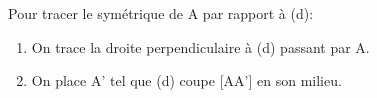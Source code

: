 Pour tracer le symétrique de \textsf{A} par rapport à \textsf{(d)}:
\begin{enumerate}
    \item On trace la droite perpendiculaire à \textsf{(d)} passant par
    \textsf{A}.
    \item On place \textsf{A'} tel que \textsf{(d)} coupe \textsf{[AA']}
    en son milieu.
\end{enumerate}
